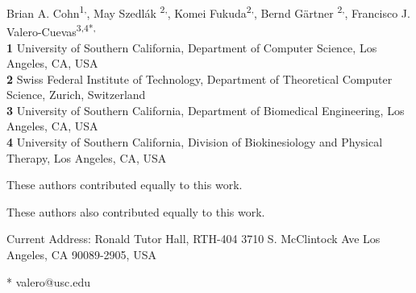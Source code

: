 \documentclass[10pt,letterpaper]{article}
\date{}
\begin{document}
\vspace*{0.2in}

\begin{flushleft}
{\Large

\textbf{} %
}



Brian A. Cohn\textsuperscript{1,\Yinyang},
May Szedl\'{a}k \textsuperscript{2,\Yinyang},
Komei Fukuda\textsuperscript{2,\ddag},
Bernd G{\"a}rtner \textsuperscript{2,\ddag},
Francisco J. Valero-Cuevas\textsuperscript{3,4*,\ddag}
\\
\bigskip
\textbf{1} University of Southern California, Department of Computer Science, Los Angeles, CA, USA
\\
\textbf{2} Swiss Federal Institute of Technology, Department of Theoretical Computer Science, Zurich, Switzerland 
\\
\textbf{3} University of Southern California, Department of Biomedical Engineering, Los Angeles, CA, USA
\\
\textbf{4} University of Southern California, Division of Biokinesiology and Physical Therapy, Los Angeles, CA, USA
\\
\bigskip

% 
%
\Yinyang These authors contributed equally to this work.

\ddag These authors also contributed equally to this work.

\textcurrency Current Address: Ronald Tutor Hall, RTH-404 
3710 S. McClintock Ave 
Los Angeles, CA 90089-2905, USA  %



* valero@usc.edu

\end{flushleft}
\end{document}
